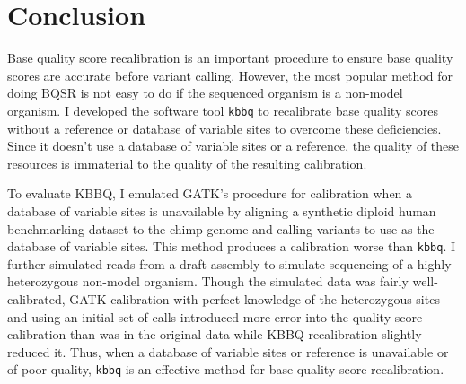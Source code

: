 

\section{Conclusion}

Base quality score recalibration is an important procedure to ensure base quality scores are accurate before variant calling. However, the most popular method for doing BQSR is not easy to do if the sequenced organism is a non-model organism. I developed the software tool \texttt{kbbq} to recalibrate base quality scores without a reference or database of variable sites to overcome these deficiencies. Since it doesn't use a database of variable sites or a reference, the quality of these resources is immaterial to the quality of the resulting calibration.

To evaluate KBBQ, I emulated GATK's procedure for calibration when a database of variable sites is unavailable by aligning a synthetic diploid human benchmarking dataset to the chimp genome and calling variants to use as the database of variable sites. This method produces a calibration worse than \texttt{kbbq}. I further simulated reads from a draft assembly to simulate sequencing of a highly heterozygous non-model organism. Though the simulated data was fairly well-calibrated, GATK calibration with perfect knowledge of the heterozygous sites and using an initial set of calls introduced more error into the quality score calibration than was in the original data while KBBQ recalibration slightly reduced it. Thus, when a database of variable sites or reference is unavailable or of poor quality, \texttt{kbbq} is an effective method for base quality score recalibration.

\printbibliography[segment=\therefsegment]{}

